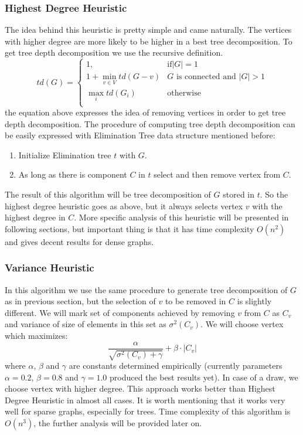 \documentclass[a4paper]{article}
\begin{document}
	\subsubsection{Highest Degree Heuristic}
	The idea behind this heuristic is pretty simple and came naturally. The vertices with higher degree are more likely to be higher in a best tree decomposition. To get tree depth decomposition we use the recursive deﬁnition.
	\begin{equation}
	td\left(G\right) = 
	\begin{cases}
	1, & \mbox{if}\left|G\right|=1 \\
	1+\min_{v\in V}td\left(G-v\right) & G\mbox{ is connected and }\left|G\right| > 1 \\
	\max _i td(G_i) & \mbox{otherwise} \\
	\end{cases}
	\label{tddef}
	\end{equation}
	the equation above expresses the idea of removing vertices in order to get tree depth decomposition. The procedure of computing tree depth decomposition can be easily expressed with Elimination Tree data structure mentioned before:
	\begin{enumerate}
		\item Initialize Elimination tree $t$ with $G$.
		\item As long as there is component $C$ in $t$ select and then remove vertex from $C$.
	\end{enumerate}
	The result of this algorithm will be tree decomposition of $G$ stored in $t$. So the highest degree heuristic goes as above, but it always selects vertex $v$ with the highest degree in $C$. More speciﬁc analysis of this heuristic will be presented in following sections, but important thing is that it has time complexity $O(n^2)$ and gives decent results for dense graphs.
	\subsubsection{Variance Heuristic}
	In this algorithm we use the same procedure to generate tree decomposition of $G$ as in previous section, but the selection of $v$ to be removed in $C$ is slightly diﬀerent. We will mark set of components achieved by removing $v$ from $C$ as $C_v$ and variance of size of elements in this set as $\sigma^2(C_v)$. We will choose vertex which maximizes: 
	\begin{equation}
	\frac{\alpha}{\sqrt{\sigma^2(C_v)+\gamma}}+\beta\cdot |C_v|
	\end{equation}
	where $\alpha$, $\beta$ and $\gamma$ are constants determined empirically (currently parameters $\alpha=0.2$, $\beta=0.8$ and  $\gamma=1.0$ produced the best results yet). In case of a draw, we choose vertex with higher degree. This approach works better than Highest Degree Heuristic in almost all cases. It is worth mentioning that it works very well for sparse graphs, especially for trees. Time complexity of this algorithm is $O(n^3)$, the further analysis will be provided later on.
\end{document}
